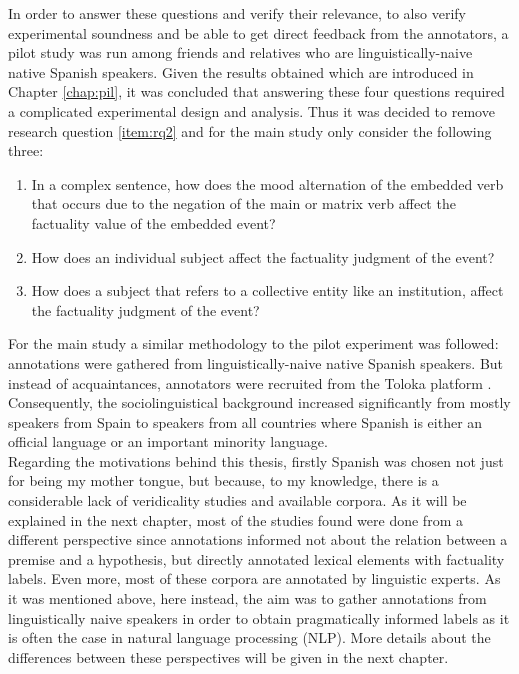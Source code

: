 In order to answer these questions and verify their relevance, to also verify experimental soundness and be able to get direct feedback from the annotators, a pilot study was run among friends and relatives who are linguistically-naive native Spanish speakers. Given the results obtained which are introduced in Chapter \ref{chap:pil}, it was concluded that answering these four questions required a complicated experimental design and analysis. Thus it was decided to remove research question \ref{item:rq2} and for the main study only consider the following three:\\

\begin{enumerate}[RQ1.-]
        \item In a complex sentence, how does the mood alternation of the embedded verb that occurs due to the negation of the main or matrix verb affect the factuality value of the embedded event?
        \item How does an individual subject affect the factuality judgment of the event?
        \item How does a subject that refers to a collective entity like an institution, affect the factuality judgment of the event?\label{item:rq4}
\end{enumerate}

For the main study a similar methodology to the pilot experiment was followed: annotations were gathered from linguistically-naive native Spanish speakers. But instead of acquaintances, annotators were recruited from the Toloka platform \citep{Pavlichenko2021crowdspeech}. Consequently, the sociolinguistical background increased significantly from mostly speakers from Spain to speakers from all countries where Spanish is either an official language or an important minority language.\\

Regarding the motivations behind this thesis, firstly Spanish was chosen not just for being my mother tongue, but because, to my knowledge, there is a considerable lack of veridicality studies and available corpora. As it will be explained in the next chapter, most of the studies found were done from a different perspective since annotations informed not about the relation between a premise and a hypothesis, but directly annotated lexical elements with factuality labels. Even more, most of these corpora are annotated by linguistic experts. As it was mentioned above, here instead, the aim was to gather annotations from linguistically naive speakers in order to obtain pragmatically informed labels as it is often the case in natural language processing (NLP). More details about the differences between these perspectives will be given in the next chapter.\\

